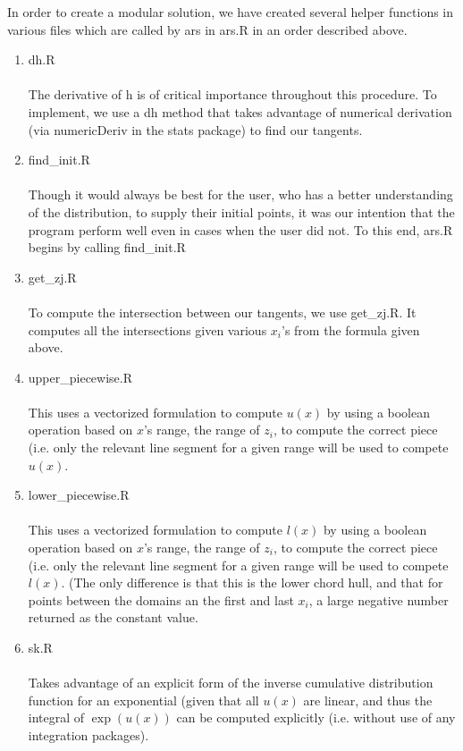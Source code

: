 \documentclass[12pt, oneside]{article}
\begin{document}
In order to create a modular solution, we have created several helper functions in various files which are called by ars in ars.R in an order described above.
\begin{enumerate}

\item dh.R\\\\
The derivative of h is of critical importance throughout this procedure.  To implement, we use a dh method that takes advantage of numerical derivation (via numericDeriv in the stats package) to find our tangents.\\
\item find\_init.R\\\\
Though it would always be best for the user, who has a better understanding of the distribution, to supply their initial points, it was our intention that the program perform well even in cases when the user did not.  To this end, ars.R begins by calling find\_init.R\\
\item get\_zj.R\\\\
To compute the intersection between our tangents, we use get\_zj.R.  It computes all the intersections given various \(x_i\)'s from the formula given above.\\
\item upper\_piecewise.R\\\\
This uses a vectorized formulation to compute \(u(x)\) by using a boolean operation based on \(x\)'s range, the range of \(z_i\), to compute the correct piece (i.e. only the relevant line segment for a given range will be used to compete \(u(x)\).
\item lower\_piecewise.R\\\\
This uses a vectorized formulation to compute \(l(x)\) by using a boolean operation based on \(x\)'s range, the range of \(z_i\), to compute the correct piece (i.e. only the relevant line segment for a given range will be used to compete \(l(x)\).  (The only difference is that this is the lower chord hull, and that for points between the domains an the first and last \(x_i\), a large negative number returned as the constant value.
\item sk.R\\\\
Takes advantage of an explicit form of the inverse cumulative distribution function for an exponential (given that all \(u(x)\) are linear, and thus the integral of \(\exp(u(x))\) can be computed explicitly (i.e. without use of any integration packages).
\end{enumerate}
\end{document}
